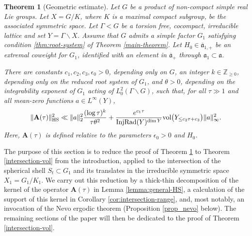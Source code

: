 \documentclass[12pt]{amsart}
\newtheorem{theorem}{Theorem}[section]
\theoremstyle{remark}
\newcommand{\Z}{\mathbb Z}
\newcommand{\ga}{\mathfrak a}
\begin{document}
\begin{theorem}[Geometric estimate]\label{main-geom-thm}
Let $G$ be a product of non-compact simple real Lie groups. Let $X = G/K$, where $K$ is a maximal compact subgroup, be the associated symmetric space. Let $\Gamma<G$ be a torsion free, cocompact, irreducible lattice and set $Y = \Gamma\backslash X$. Assume that $G$ admits a simple factor $G_1$ satisfying condition \eqref{thm:root-system} of Theorem \ref{main-theorem}. Let $H_0\in\overline{\ga}_{1,+}$ be an extremal coweight for $G_1$, identified with an element in $\overline{\ga}_+$ through $\ga_1\subset\ga$.

There are constants $c_1,c_2, c_3,\epsilon_0>0$, depending only on $G$, an integer $k\in\Z_{\geq 0}$, depending only on the reduced root system of $G_1$, and $\theta>0$, depending on the integrability exponent of $G_1$ acting of $L^2_0(\Gamma\backslash G)$, such that, for all $\tau \gg 1$ and all mean-zero functions $a\in L^\infty(Y)$,
\begin{equation}\label{eq:HS-bound}
\|\mathbf{A}(\tau)\|_{\rm HS}^2\ll \|a\|_2^2\frac{(\log\tau)^k}{\tau\theta^2}+\frac{e^{c_1 \tau}}{{\rm InjRad}(Y)^{\dim Y}} {\rm vol}\big( Y_{\le c_2 \tau+c_3}\big)\|a\|_\infty^2. 
\end{equation}
Here, $\mathbf{A}(\tau)$ is defined relative to the parameters $\epsilon_0>0$ and $H_0$.
\end{theorem}

The purpose of this section is to reduce the proof of Theorem \ref{main-geom-thm} to Theorem \ref{intersection-vol} from the introduction, applied to the intersection of the spherical shell $S_t\subset G_1$ and its translates in the irreducible symmetric space $X_1=G_1/K_1$. We carry out this reduction by a thick-thin decomposition of the kernel of the operator $\mathbf{A}(\tau)$ in Lemma \ref{lemma:general-HS}, a calculation of the support of this kernel in Corollary \ref{cor:intersection-range}, and, most notably, an invocation of the Nevo ergodic theorem (Proposition \ref{prop_nevo} below). The remaining sections of the paper will then be dedicated to the proof of Theorem \ref{intersection-vol}.
\end{document}
